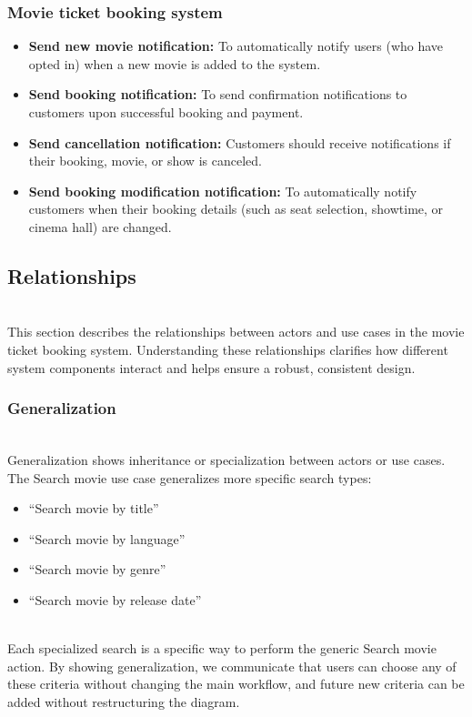 \subsubsection{Movie ticket booking system}\label{WIeipQk8lVejblzIqnRBM}

\begin{itemize}
\item
\protect{}\label{FYNcH2oWBGNspynUdvR-n}
\textbf{Send new movie notification:} To automatically notify users (who have opted in) when a new movie is added to the system.
\item
\protect{}\label{vY8IvPlGjOAIB8VRNxYjk}
\textbf{Send booking notification:} To send confirmation notifications to customers upon successful booking and payment.
\item
\protect{}\label{Nn3g1f0wNlYy7urO4zHPu}
\textbf{Send cancellation notification:} Customers should receive notifications if their booking, movie, or show is canceled.
\item
\protect{}\label{9rxgtCbVp5zx5bqrF1zuF}
\textbf{Send booking modification notification:} To automatically notify customers when their booking details (such as seat selection, showtime, or cinema hall) are changed.
\end{itemize}

\subsection{Relationships}\label{8XbeVkDuJQci_Cl5ti0sA}
\\
This section describes the relationships between actors and use cases in the movie ticket booking system. Understanding these relationships clarifies how different system components interact and helps ensure a robust, consistent design.

\subsubsection{Generalization}\label{vE54YpX_KA9gDKAJUOVIt}
\\
Generalization shows inheritance or specialization between actors or use cases. The Search movie use case generalizes more specific search types:

\begin{itemize}
\item
\protect{}\label{jJ0v6DNXvJgRwEtvgprVv}
``Search movie by title''
\item
\protect{}\label{m0JRD8vLOTXvr97ikGn9B}
``Search movie by language''
\item
\protect{}\label{rFX3V7YTLrM4DBHn3WgbD}
``Search movie by genre''
\item
\protect{}\label{LdMATf4mHE2DlBKm79UMl}
``Search movie by release date''
\end{itemize}
\\
Each specialized search is a specific way to perform the generic Search movie action. By showing generalization, we communicate that users can choose any of these criteria without changing the main workflow, and future new criteria can be added without restructuring the diagram.

